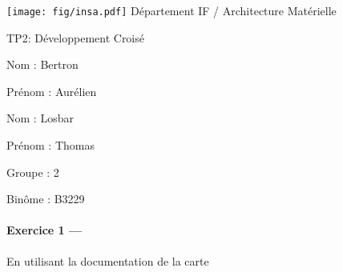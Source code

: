 \documentclass[a4paper,11pt,article]{memoir}
\renewcommand\title[1]{{\LARGE\fontfamily{pag}\selectfont #1}\par\bigskip}
\begin{document}
\texttt{[image: fig/insa.pdf]}
%
\hfill
%
{\selectfont Département IF / Architecture Matérielle}

\bigskip

\title{TP2: Développement Croisé}

\bigskip
\noindent\par\parbox{.48\textwidth}{Nom : Bertron} \parbox{.48\textwidth}{Prénom : Aurélien}
\bigskip
\noindent\par\parbox{.48\textwidth}{Nom : Losbar} \parbox{.48\textwidth}{Prénom : Thomas}
\bigskip
\noindent\par\parbox{.2\textwidth}{Groupe : 2} \parbox{.2\textwidth}{Binôme : B3229}

\bigskip

\paragraph{Exercice 1 ---}  En utilisant la documentation  de la carte
\end{document}
